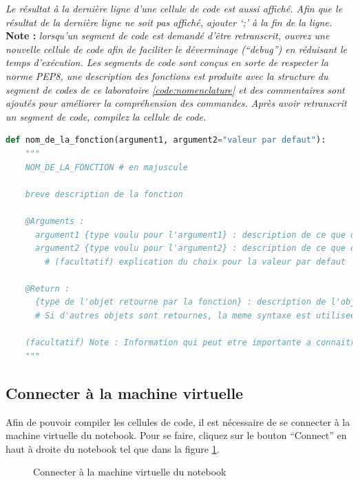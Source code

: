 \documentclass{article}
\begin{document}
\textit{Le résultat à la dernière ligne d'une cellule de code est aussi affiché. Afin que le résultat de la dernière ligne ne soit pas affiché, ajouter `;' à la fin de la ligne.}
\medbreak
\textbf{Note : }\textit{lorsqu'un segment de code est demandé d'être retranscrit, ouvrez une nouvelle cellule de code afin de faciliter le déverminage (``debug'') en réduisant le temps d'exécution. Les segments de code sont conçus en sorte de respecter la norme PEP8, une description des fonctions est produite avec la structure du segment de codes de ce laboratoire \ref{code:nomenclature} et des commentaires sont ajoutés pour améliorer la compréhension des commandes. Après avoir retranscrit un segment de code, compilez la cellule de code.}
\medbreak
\begin{lstlisting}[language=Python, caption={Nomenclature de la description des fonctions}, label={code:nomenclature}]
def nom_de_la_fonction(argument1, argument2="valeur par defaut"):
    """
    NOM_DE_LA_FONCTION # en majuscule

    breve description de la fonction

    @Arguments :
      argument1 {type voulu pour l'argument1} : description de ce que doit etre l'argument1
      argument2 {type voulu pour l'argument2} : description de ce que doit etre l'argument2
        # (facultatif) explication du choix pour la valeur par defaut

    @Return :
      {type de l'objet retourne par la fonction} : description de l'objet retourne par la fonction
      # Si d'autres objets sont retournes, la meme syntaxe est utilisee pour chaque objet.

    (facultatif) Note : Information qui peut etre importante a connaitre pour l'utilisation de la fonction
    """
\end{lstlisting}
\medbreak

\subsection{Connecter à la machine virtuelle}

Afin de pouvoir compiler les cellules de code, il est nécessaire de se connecter à la machine virtuelle du notebook. Pour se faire, cliquez sur le bouton ``Connect'' en haut à droite du notebook tel que dans la figure \ref{fig:connect}.

\begin{figure}[H]
  \centering
  \caption{Connecter à la machine virtuelle du notebook}
  \label{fig:connect}
\end{figure}
\end{document}
